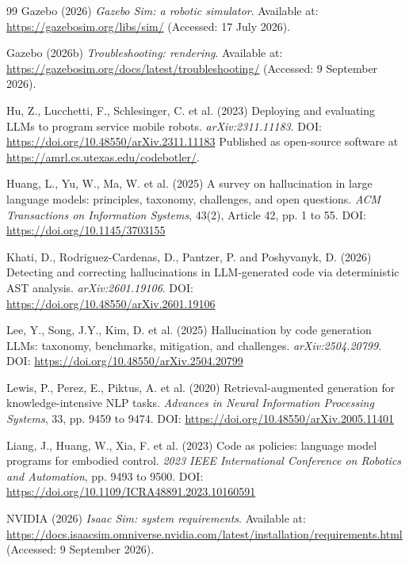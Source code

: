 \documentclass[11pt,a4paper]{report}
\begin{document}
\begin{thebibliography}{99}
 Gazebo (2026) \textit{Gazebo Sim: a robotic simulator}. Available at: \url{https://gazebosim.org/libs/sim/} (Accessed: 17 July 2026).

 Gazebo (2026b) \textit{Troubleshooting: rendering}. Available at: \url{https://gazebosim.org/docs/latest/troubleshooting/} (Accessed: 9 September 2026).

 Hu, Z., Lucchetti, F., Schlesinger, C. et al. (2023) Deploying and evaluating LLMs to program service mobile robots. \textit{arXiv:2311.11183}. DOI: \url{https://doi.org/10.48550/arXiv.2311.11183} Published as open-source software at \url{https://amrl.cs.utexas.edu/codebotler/}.

 Huang, L., Yu, W., Ma, W. et al. (2025) A survey on hallucination in large language models: principles, taxonomy, challenges, and open questions. \textit{ACM Transactions on Information Systems}, 43(2), Article 42, pp. 1 to 55. DOI: \url{https://doi.org/10.1145/3703155}

 Khati, D., Rodriguez-Cardenas, D., Pantzer, P. and Poshyvanyk, D. (2026) Detecting and correcting hallucinations in LLM-generated code via deterministic AST analysis. \textit{arXiv:2601.19106}. DOI: \url{https://doi.org/10.48550/arXiv.2601.19106}

 Lee, Y., Song, J.Y., Kim, D. et al. (2025) Hallucination by code generation LLMs: taxonomy, benchmarks, mitigation, and challenges. \textit{arXiv:2504.20799}. DOI: \url{https://doi.org/10.48550/arXiv.2504.20799}

 Lewis, P., Perez, E., Piktus, A. et al. (2020) Retrieval-augmented generation for knowledge-intensive NLP tasks. \textit{Advances in Neural Information Processing Systems}, 33, pp. 9459 to 9474. DOI: \url{https://doi.org/10.48550/arXiv.2005.11401}

 Liang, J., Huang, W., Xia, F. et al. (2023) Code as policies: language model programs for embodied control. \textit{2023 IEEE International Conference on Robotics and Automation}, pp. 9493 to 9500. DOI: \url{https://doi.org/10.1109/ICRA48891.2023.10160591}

 NVIDIA (2026) \textit{Isaac Sim: system requirements}. Available at: \url{https://docs.isaacsim.omniverse.nvidia.com/latest/installation/requirements.html} (Accessed: 9 September 2026).


\end{thebibliography}
\end{document}
